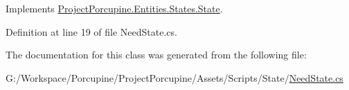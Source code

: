 Implements \hyperlink{class_project_porcupine_1_1_entities_1_1_states_1_1_state_a46337df73c448f5dd84e350e987af8b5}{Project\+Porcupine.\+Entities.\+States.\+State}.



Definition at line 19 of file Need\+State.\+cs.



The documentation for this class was generated from the following file\+:\begin{DoxyCompactItemize}
\item 
G\+:/\+Workspace/\+Porcupine/\+Project\+Porcupine/\+Assets/\+Scripts/\+State/\hyperlink{_need_state_8cs}{Need\+State.\+cs}\end{DoxyCompactItemize}
